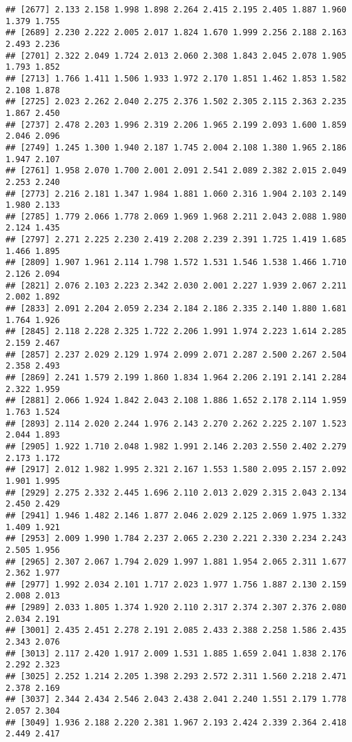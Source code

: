 \documentclass[
]{article}
\begin{document}
\begin{verbatim}
## [2677] 2.133 2.158 1.998 1.898 2.264 2.415 2.195 2.405 1.887 1.960 1.379 1.755
## [2689] 2.230 2.222 2.005 2.017 1.824 1.670 1.999 2.256 2.188 2.163 2.493 2.236
## [2701] 2.322 2.049 1.724 2.013 2.060 2.308 1.843 2.045 2.078 1.905 1.793 1.852
## [2713] 1.766 1.411 1.506 1.933 1.972 2.170 1.851 1.462 1.853 1.582 2.108 1.878
## [2725] 2.023 2.262 2.040 2.275 2.376 1.502 2.305 2.115 2.363 2.235 1.867 2.450
## [2737] 2.478 2.203 1.996 2.319 2.206 1.965 2.199 2.093 1.600 1.859 2.046 2.096
## [2749] 1.245 1.300 1.940 2.187 1.745 2.004 2.108 1.380 1.965 2.186 1.947 2.107
## [2761] 1.958 2.070 1.700 2.001 2.091 2.541 2.089 2.382 2.015 2.049 2.253 2.240
## [2773] 2.216 2.181 1.347 1.984 1.881 1.060 2.316 1.904 2.103 2.149 1.980 2.133
## [2785] 1.779 2.066 1.778 2.069 1.969 1.968 2.211 2.043 2.088 1.980 2.124 1.435
## [2797] 2.271 2.225 2.230 2.419 2.208 2.239 2.391 1.725 1.419 1.685 1.466 1.895
## [2809] 1.907 1.961 2.114 1.798 1.572 1.531 1.546 1.538 1.466 1.710 2.126 2.094
## [2821] 2.076 2.103 2.223 2.342 2.030 2.001 2.227 1.939 2.067 2.211 2.002 1.892
## [2833] 2.091 2.204 2.059 2.234 2.184 2.186 2.335 2.140 1.880 1.681 1.764 1.926
## [2845] 2.118 2.228 2.325 1.722 2.206 1.991 1.974 2.223 1.614 2.285 2.159 2.467
## [2857] 2.237 2.029 2.129 1.974 2.099 2.071 2.287 2.500 2.267 2.504 2.358 2.493
## [2869] 2.241 1.579 2.199 1.860 1.834 1.964 2.206 2.191 2.141 2.284 2.322 1.959
## [2881] 2.066 1.924 1.842 2.043 2.108 1.886 1.652 2.178 2.114 1.959 1.763 1.524
## [2893] 2.114 2.020 2.244 1.976 2.143 2.270 2.262 2.225 2.107 1.523 2.044 1.893
## [2905] 1.922 1.710 2.048 1.982 1.991 2.146 2.203 2.550 2.402 2.279 2.173 1.172
## [2917] 2.012 1.982 1.995 2.321 2.167 1.553 1.580 2.095 2.157 2.092 1.901 1.995
## [2929] 2.275 2.332 2.445 1.696 2.110 2.013 2.029 2.315 2.043 2.134 2.450 2.429
## [2941] 1.946 1.482 2.146 1.877 2.046 2.029 2.125 2.069 1.975 1.332 1.409 1.921
## [2953] 2.009 1.990 1.784 2.237 2.065 2.230 2.221 2.330 2.234 2.243 2.505 1.956
## [2965] 2.307 2.067 1.794 2.029 1.997 1.881 1.954 2.065 2.311 1.677 2.362 1.977
## [2977] 1.992 2.034 2.101 1.717 2.023 1.977 1.756 1.887 2.130 2.159 2.008 2.013
## [2989] 2.033 1.805 1.374 1.920 2.110 2.317 2.374 2.307 2.376 2.080 2.034 2.191
## [3001] 2.435 2.451 2.278 2.191 2.085 2.433 2.388 2.258 1.586 2.435 2.343 2.076
## [3013] 2.117 2.420 1.917 2.009 1.531 1.885 1.659 2.041 1.838 2.176 2.292 2.323
## [3025] 2.252 1.214 2.205 1.398 2.293 2.572 2.311 1.560 2.218 2.471 2.378 2.169
## [3037] 2.344 2.434 2.546 2.043 2.438 2.041 2.240 1.551 2.179 1.778 2.057 2.304
## [3049] 1.936 2.188 2.220 2.381 1.967 2.193 2.424 2.339 2.364 2.418 2.449 2.417

\end{verbatim}
\end{document}

